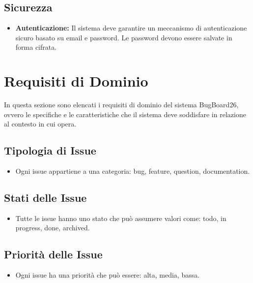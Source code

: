 \subsection{Sicurezza}
\begin{itemize}
    \item \textbf{Autenticazione:} Il sistema deve garantire un meccanismo di autenticazione sicuro basato su email e password. Le password devono essere salvate in forma cifrata.
\end{itemize}






\newpage

\section{Requisiti di Dominio}\label{RequisitiDominio}
In questa sezione sono elencati i requisiti di dominio del sistema BugBoard26, ovvero le specifiche e le caratteristiche che il sistema deve soddisfare in relazione al contesto in cui opera.
\subsection{Tipologia di Issue}
\begin{itemize}
    \item Ogni issue appartiene a una categoria: bug, feature, question, documentation.
\end{itemize}

\subsection{Stati delle Issue}
\begin{itemize}
    \item Tutte le issue hanno uno stato che può assumere valori come: todo, in progress, done, archived.
\end{itemize}

\subsection{Priorità delle Issue}
\begin{itemize}
    \item Ogni issue ha una priorità che può essere: alta, media, bassa.
\end{itemize}
